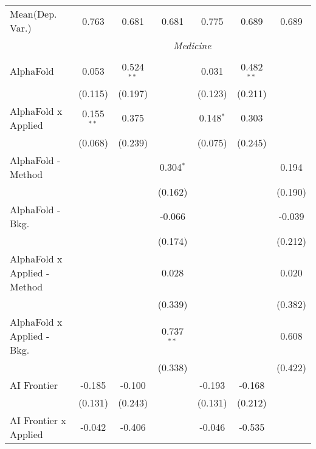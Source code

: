 \begin{tabular}{lcccccc}
Mean(Dep. Var.) & 0.763 & 0.681 & 0.681 & 0.775 & 0.689 & 0.689 \\
 & \multicolumn{6}{c}{\textit{Medicine}} \\ \\
   AlphaFold                      & 0.053        & 0.524$^{**}$ &              & 0.031       & 0.482$^{**}$ &   \\   
                                  & (0.115)      & (0.197)      &              & (0.123)     & (0.211)      &   \\   
   AlphaFold x Applied            & 0.155$^{**}$ & 0.375        &              & 0.148$^{*}$ & 0.303        &   \\   
                                  & (0.068)      & (0.239)      &              & (0.075)     & (0.245)      &   \\   
   AlphaFold - Method             &              &              & 0.304$^{*}$  &             &              & 0.194\\   
                                  &              &              & (0.162)      &             &              & (0.190)\\   
   AlphaFold - Bkg.               &              &              & -0.066       &             &              & -0.039\\   
                                  &              &              & (0.174)      &             &              & (0.212)\\   
   AlphaFold x Applied - Method   &              &              & 0.028        &             &              & 0.020\\   
                                  &              &              & (0.339)      &             &              & (0.382)\\   
   AlphaFold x Applied - Bkg.     &              &              & 0.737$^{**}$ &             &              & 0.608\\   
                                  &              &              & (0.338)      &             &              & (0.422)\\   
   AI Frontier                    & -0.185       & -0.100       &              & -0.193      & -0.168       &   \\   
                                  & (0.131)      & (0.243)      &              & (0.131)     & (0.212)      &   \\   
   AI Frontier x Applied          & -0.042       & -0.406       &              & -0.046      & -0.535       &   \\   

\end{tabular}
